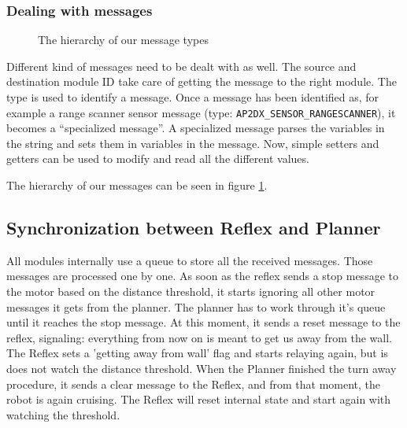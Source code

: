 \subsubsection{Dealing with messages}
\begin{figure}
\centerline{
}
\caption{The hierarchy of our message types}
\label{fig:messageHierarchy}
\end{figure}
Different kind of messages need to be dealt with as well. The source and destination module ID take care
of getting the message to the right module. The type is used to identify a message. Once a message
has been identified as, for example a range scanner sensor message (type:
\texttt{AP2DX\_SENSOR\_RANGESCANNER}), 
it becomes a ``specialized message''. 
A specialized message parses the variables in the string and sets them in variables in the message. Now,
simple setters and getters can be used to modify and read all the different
values.

The hierarchy of our messages can be seen in figure \ref{fig:messageHierarchy}. 


\subsection{Synchronization between Reflex and Planner}
All modules internally use a queue to store all the received messages. Those messages are processed one by one. As soon as the reflex sends a stop message to the motor based on the distance threshold, it starts ignoring all other motor messages it gets from the planner. The planner has to work through it's queue until it reaches the stop message. At this moment, it sends a reset message to the reflex, signaling: everything from now on is meant to get us away from the wall. The Reflex sets a 'getting away from wall' flag and starts relaying again, but is does not watch the distance threshold. When the Planner finished the turn away procedure, it sends a clear message to the Reflex, and from that moment, the robot is again cruising. The Reflex will reset internal state and start again with watching the threshold.
